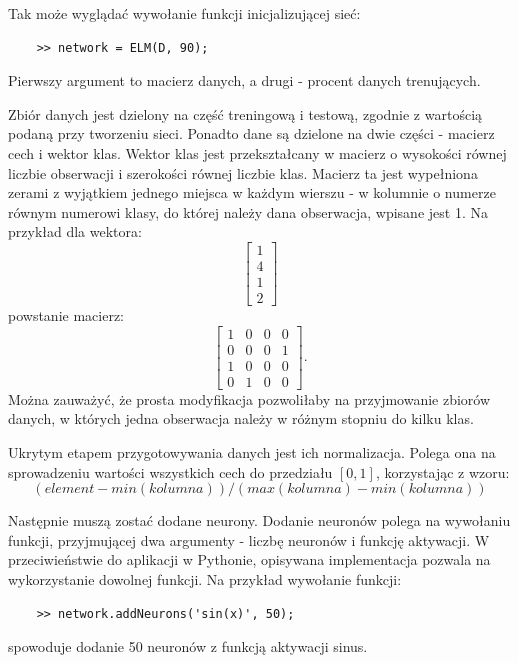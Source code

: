 \documentclass{article}
\begin{document}
Tak może wyglądać wywołanie funkcji inicjalizującej sieć:


\begin{lstlisting}
	>> network = ELM(D, 90);
\end{lstlisting}
Pierwszy argument to macierz danych, a drugi - procent danych trenujących.

Zbiór danych jest dzielony na część treningową i testową, zgodnie z wartością podaną przy tworzeniu sieci. 
Ponadto dane są dzielone na dwie części - macierz cech i wektor klas.
Wektor klas jest przekształcany w macierz o wysokości równej liczbie obserwacji i szerokości równej liczbie klas.
Macierz ta jest wypełniona zerami z wyjątkiem jednego miejsca w każdym wierszu - w kolumnie o numerze równym numerowi klasy, do której należy dana obserwacja, wpisane jest 1.
Na przykład dla wektora:
\[ \begin{bmatrix} 1 \\ 4 \\ 1 \\ 2 \end{bmatrix}\]
powstanie macierz:
\[ \begin{bmatrix} 1&0&0&0 \\ 0&0&0&1 \\ 1&0&0&0 \\ 0&1&0&0 \end{bmatrix}.\]
Można zauważyć, że prosta modyfikacja pozwoliłaby na przyjmowanie zbiorów danych, w których jedna obserwacja należy w różnym stopniu do kilku klas.

Ukrytym etapem przygotowywania danych jest ich normalizacja. 
Polega ona na sprowadzeniu wartości wszystkich cech do przedziału $[0, 1]$, korzystając z wzoru:
\[(element - min(kolumna))/(max(kolumna) - min(kolumna))\]

Następnie muszą zostać dodane neurony.
Dodanie neuronów polega na wywołaniu funkcji, przyjmującej dwa argumenty - liczbę neuronów i funkcję aktywacji.
W przeciwieństwie do aplikacji w Pythonie, opisywana implementacja pozwala na wykorzystanie dowolnej funkcji.
Na przykład wywołanie funkcji:
\begin{lstlisting}
	>> network.addNeurons('sin(x)', 50);
\end{lstlisting}
spowoduje dodanie 50 neuronów z funkcją aktywacji sinus.
\end{document}
